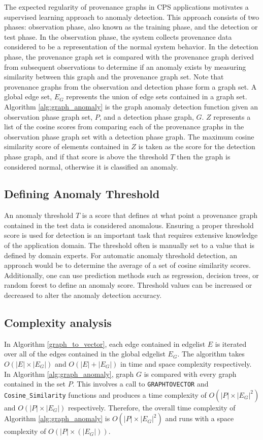 \par The expected regularity of provenance graphs in CPS applications motivates a supervised learning approach to anomaly detection. This approach consists of two phases: observation phase, also known as the training phase, and the detection or test phase. In the observation phase, the system collects provenance data considered to be a representation of the normal system behavior. In the detection phase, the provenance graph set is compared with the provenance graph derived from subsequent observations to determine if an anomaly exists by measuring similarity between this graph and the provenance graph set. Note that provenance graphs from the observation and detection phase form a graph set. A global edge set, $E_G$ represents the union of edge sets contained in a graph set. Algorithm \ref{alg:graph_anomaly} is the graph anomaly detection function given an observation phase graph set, $P$, and a detection phase graph, $G$. $Z$ represents a list of the cosine scores from comparing each of the provenance graphs in the observation phase graph set with a detection phase graph. The maximum cosine similarity score of elements contained in $Z$ is taken as the score for the detection phase graph, and if that score is above the threshold $T$ then the graph is considered normal, otherwise it is classified an anomaly.

\subsection{Defining Anomaly Threshold}
An anomaly threshold $T$ is a score that defines at what point a provenance graph contained in the test data is considered anomalous. Ensuring a proper threshold score is used for detection is an important task that requires extensive knowledge of the application domain. The threshold often is manually set to a value that is defined by domain experts. For automatic anomaly threshold detection, an approach would be to determine the average of a set of cosine similarity scores. Additionally, one can use prediction methods such as regression, decision trees, or random forest to define an anomaly score. Threshold values can be increased or decreased to alter the anomaly detection accuracy. 


\subsection{Complexity analysis}

In Algorithm \ref{graph_to_vector}, each edge contained in edgelist $E$ is iterated over all of the edges contained in the global edgelist $E_G$. The algorithm takes $O(|E| \times |E_G|)$ and $O(|E| + |E_G|)$ in time and space complexity respectively. In Algorithm \ref{alg:graph_anomaly}, graph $G$ is compared with every graph contained in the set $P$. This involves a call to \texttt{GRAPHTOVECTOR} and \texttt{Cosine\_Similarity} functions and produces a time complexity of $O(|P| \times |E_G|^2)$ and $O(|P| \times |E_G|)$ respectively. Therefore, the overall time complexity of Algorithm \ref{alg:graph_anomaly} is $O(|P| \times |E_G|^2)$ and runs with a space complexity of $O(|P| \times (|E_G|))$.



